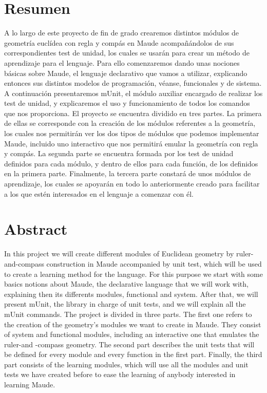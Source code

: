 
\section*{Resumen}

A lo largo de este proyecto de fin de grado crearemos distintos módulos de geometría euclídea con regla y compás en Maude acompañándolos de sus correspondientes test de unidad, los cuales se usarán para crear un método de aprendizaje para el lenguaje. Para ello comenzaremos dando unas nociones básicas sobre Maude, el lenguaje declarativo que vamos a utilizar, explicando entonces sus distintos modelos de programación, véanse, funcionales y de sistema. A continuación presentaremos mUnit, el módulo auxiliar encargado de realizar los test de unidad, y explicaremos el uso y funcionamiento de todos los comandos que nos proporciona. El proyecto se encuentra dividido en tres partes. La primera de ellas se corresponde con la creación de los módulos referentes a la geometría, los cuales nos permitirán ver los dos tipos de módulos que podemos implementar Maude, incluido uno interactivo que nos permitirá emular la geometría con regla y compás. La segunda parte se encuentra formada por los test de unidad definidos para cada módulo, y dentro de ellos para cada función, de los definidos en la primera parte. Finalmente, la tercera parte constará de unos módulos de aprendizaje, los cuales se apoyarán en todo lo anteriormente creado para facilitar a los que estén interesados en el lenguaje a comenzar con él. \par

\section*{Abstract}

In this project we will create different modules of Euclidean geometry by ruler-and-compass construction in Maude accompanied by unit test, which will be used to create a learning method for the language. For this purpose we start with some basics notions about Maude, the declarative language that we will work with, explaining then its differents modules, functional and system. After that, we will present mUnit, the library in charge of unit tests, and we will explain all the mUnit commands. The project is divided in three parts. The first one refers to the creation of the geometry's modules we want to create in Maude. They consist of system and functional modules, including an interactive one that emulates the ruler-and -compass geometry. The second part describes the unit tests that will be defined for every module and every function in the first part. Finally, the third part consists of the learning modules, which will use all the modules and unit tests we have created before to ease the learning of anybody interested in learning Maude. \par
